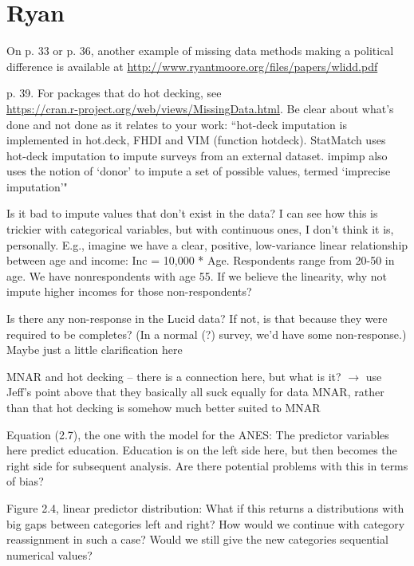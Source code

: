 \documentclass[12pt]{article}
\begin{document}
\section*{Ryan}
	\begin{coi}
		\item On p. 33 or p. 36, another example of missing data methods making a political difference is available at \href{http://www.ryantmoore.org/files/papers/wlidd.pdf}{http://www.ryantmoore.org/files/papers/wlidd.pdf}
		\item p. 39. For packages that do hot decking, see \\\href{https://cran.r-project.org/web/views/MissingData.html}{https://cran.r-project.org/web/views/MissingData.html}. Be clear about what's done and not done as it relates to your work: ``hot-deck imputation is implemented in hot.deck, FHDI and VIM (function hotdeck). StatMatch uses hot-deck imputation to impute surveys from an external dataset. impimp also uses the notion of `donor' to impute a set of possible values, termed `imprecise imputation'"
		\item Is it bad to impute values that don't exist in the data? I can see how this is trickier with categorical variables, but with continuous ones, I don't think it is, personally. E.g., imagine we have a clear, positive, low-variance linear relationship between age and income: Inc = 10,000 * Age. Respondents range from 20-50 in age. We have nonrespondents with age 55. If we believe the linearity, why not impute higher incomes for those non-respondents?
		\item Is there any non-response in the Lucid data? If not, is that because they were required to be completes? (In a normal (?) survey, we'd have some non-response.) Maybe just a little clarification here
		\item MNAR and hot decking -- there is a connection here, but what is it? $\rightarrow$ use Jeff's point above that they basically all suck equally for data MNAR, rather than that hot decking is somehow much better suited to MNAR
		\item Equation (2.7), the one with the model for the ANES: The predictor variables here predict education. Education is on the left side here, but then becomes the right side for subsequent analysis. Are there potential problems with this in terms of bias?
		\item Figure 2.4, linear predictor distribution: What if this returns a distributions with big gaps between categories left and right? How would we continue with category reassignment in such a case? Would we still give the new categories sequential numerical values?
	\end{coi}
\end{document}
